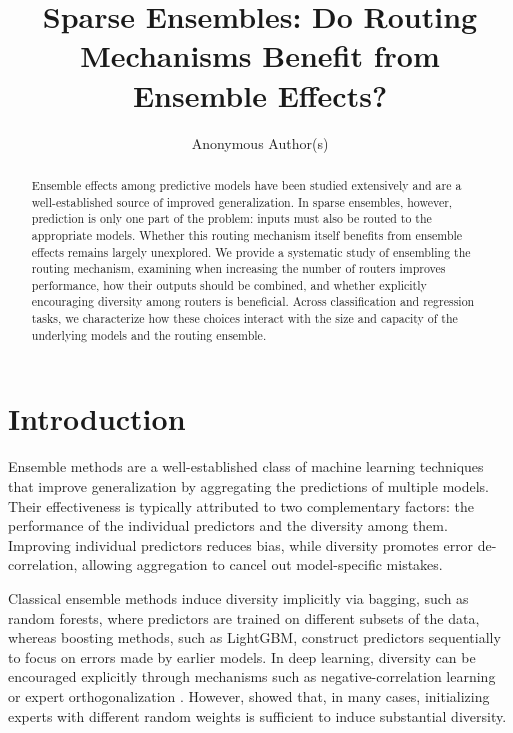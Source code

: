\documentclass[10pt]{article} %
\title{Sparse Ensembles: Do Routing Mechanisms Benefit from Ensemble Effects?}
\author{Anonymous Author(s)}
\begin{document}
\maketitle

\begin{abstract}
Ensemble effects among predictive models have been studied extensively and are a well-established source of improved generalization. In sparse ensembles, however, prediction is only one part of the problem: inputs must also be routed to the appropriate models. Whether this routing mechanism itself benefits from ensemble effects remains largely unexplored. We provide a systematic study of ensembling the routing mechanism, examining when increasing the number of routers improves performance, how their outputs should be combined, and whether explicitly encouraging diversity among routers is beneficial. Across classification and regression tasks, we characterize how these choices interact with the size and capacity of the underlying models and the routing ensemble.

\end{abstract}

\section{Introduction}

Ensemble methods are a well-established class of machine learning techniques that improve generalization by aggregating the predictions of multiple models. Their effectiveness is typically attributed to two complementary factors: the performance of the individual predictors and the diversity among them. Improving individual predictors reduces bias, while diversity promotes  error de-correlation, allowing aggregation to cancel out model-specific mistakes.

Classical ensemble methods induce diversity implicitly via bagging, such as random forests, where predictors are trained on different subsets of the data, whereas boosting methods, such as LightGBM, construct predictors sequentially to focus on errors made by earlier models. In deep learning, diversity can be encouraged explicitly through mechanisms such as negative-correlation learning \citep{chen_ncl_weight} or expert orthogonalization \citep{liu2024diversifying}. However, \citet{fort2019deep} showed that, in many cases, initializing experts with different random weights is sufficient to induce substantial diversity.
\end{document}
